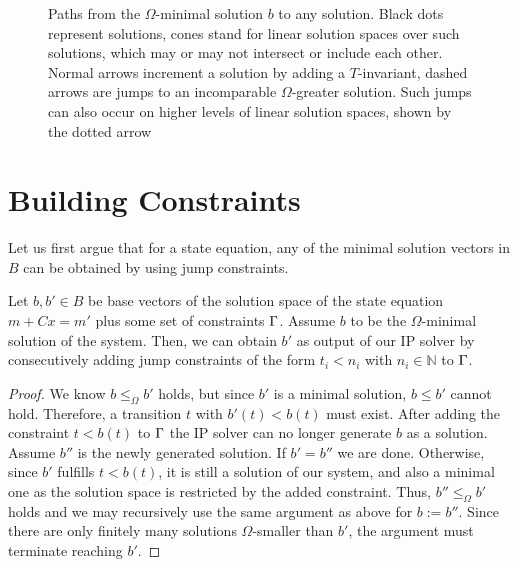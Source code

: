\documentclass{LMCS}
\newcommand{\nat}{\mathbb{N}}
\newcommand{\I}{C} \newcommand{\C}{{\ensuremath \Gamma}} \newcommand{\ord}{\ensuremath{\Omega}}
\begin{document}
\begin{figure}[tb]
\caption{\label{f.solpath}Paths from the $\ord$-minimal solution $b$ to any solution. Black dots represent solutions, cones
stand for linear solution spaces over such solutions, which may or may not intersect or include each other.
Normal arrows increment a solution by adding a $T$-invariant, dashed arrows are jumps to an incomparable $\ord$-greater solution.
Such jumps can also occur on higher levels of linear solution spaces, shown by the dotted arrow}
\end{figure}

\section{Building Constraints}\label{sec4}

Let us first argue that for a state equation, any of the minimal solution vectors in $B$ can be obtained by using jump
constraints.

\begin{lem}\label{L.BJ}
Let $b,b'\in B$ be base vectors of the solution space of the state equation $m+\I x=m'$ plus some set of constraints $\C$. 
Assume $b$ to be the $\ord$-minimal solution of the system. 
Then, we can obtain $b'$ as output of our IP solver by consecutively adding jump constraints of the form $t_i < n_i$ with $n_i\in\nat$ to $\C$.
\end{lem}
\begin{proof}
We know $b\le_{\ord} b'$ holds, but since $b'$ is a minimal solution, $b\le b'$ cannot hold. Therefore, a transition $t$ with
$b'(t)<b(t)$ must exist. After adding the constraint $t<b(t)$ to $\C$
the IP solver can no longer generate $b$ as a solution. Assume $b''$ is the newly generated solution. If $b'=b''$
we are done. Otherwise, since $b'$ fulfills $t<b(t)$, it is still a solution of our system, and also a minimal one as the
solution space is restricted by the added constraint. Thus, $b''\le_{\ord} b'$ holds and
we may recursively use the same argument as above for $b:=b''$. Since there are only finitely many solutions $\ord$-smaller
than $b'$, the argument must terminate reaching $b'$.
\end{proof}
\end{document}
